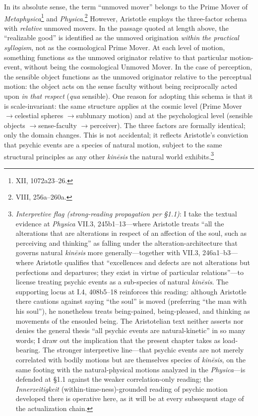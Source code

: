 \documentclass{article}
\newcommand{\ra}{\ensuremath{\rightarrow}}
\begin{document}
In its absolute sense, the term ``unmoved mover'' belongs to the Prime Mover of \textit{Metaphysica}\footnote{XII, 1072a23--26.} and \textit{Physica}.\footnote{VIII, 256a--260a.} However, Aristotle employs the three-factor schema with \textit{relative} unmoved movers. In the passage quoted at length above, the ``realizable good'' is identified as the unmoved origination \textit{within the practical syllogism}, not as the cosmological Prime Mover. At each level of motion, something functions \textit{as} the unmoved originator relative to that particular motion-event, without being the cosmological Unmoved Mover. In the case of perception, the sensible object functions as the unmoved originator relative to the perceptual motion: the object acts on the sense faculty without being reciprocally acted upon \textit{in that respect} (\textit{qua} sensible). One reason for adopting this schema is that it is scale-invariant: the same structure applies at the cosmic level (Prime Mover \ra celestial spheres \ra sublunary motion) and at the psychological level (sensible objects \ra sense-faculty \ra perceiver). The three factors are formally identical; only the domain changes. This is not accidental; it reflects Aristotle's conviction that psychic events are a species of natural motion, subject to the same structural principles as any other \textit{kinēsis} the natural world exhibits.\footnote{\textit{Interpretive flag (strong-reading propagation per \S 1.1)}: I take the textual evidence at \textit{Physica} VII.3, 245b1--13---where Aristotle treats ``all the alterations that are alterations in respect of an affection of the soul, such as perceiving and thinking'' as falling under the alteration-architecture that governs natural \textit{kinēsis} more generally---together with VII.3, 246a1--b3---where Aristotle qualifies that ``excellences and defects are not alterations but perfections and departures; they exist in virtue of particular relations''---to license treating psychic events as a sub-species of natural \textit{kinēsis}. The supporting locus at \cite{aristotle2014soul} I.4, 408b5--18 reinforces this reading: although Aristotle there cautions against saying ``the soul'' is moved (preferring ``the man with his soul''), he nonetheless treats being-pained, being-pleased, and thinking as movements of the ensouled being. The Aristotelian text neither asserts nor denies the general thesis ``all psychic events are natural-kinetic'' in so many words; I draw out the implication that the present chapter takes as load-bearing. The stronger interpretive line---that psychic events are not merely correlated with bodily motions but are themselves species of \textit{kinēsis}, on the same footing with the natural-physical motions analyzed in the \textit{Physica}---is defended at \S 1.1 against the weaker correlation-only reading; the \textit{Innerzeitigkeit} (within-time-ness)-grounded reading of psychic motion developed there is operative here, as it will be at every subsequent stage of the actualization chain.}
\end{document}
